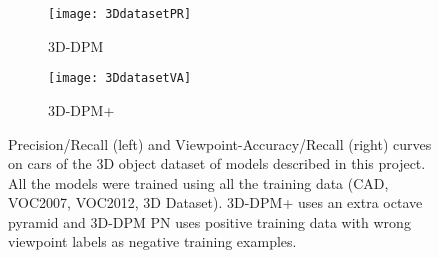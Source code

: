 

\begin{figure}
\begin{center}
	\begin{subfigure}[b]{0.49\textwidth}
       		\texttt{[image: 3DdatasetPR]}       
                \caption{3D-DPM}
        \end{subfigure}
        \begin{subfigure}[b]{0.49\textwidth}
       		\texttt{[image: 3DdatasetVA]}       
       		\caption{3D-DPM+}
        \end{subfigure}
\caption{Precision/Recall (left) and Viewpoint-Accuracy/Recall (right) curves on cars of the 3D object dataset \cite{4408987} of models described in this project. All the models were trained using all the training data (CAD, VOC2007, VOC2012, 3D Dataset). 3D-DPM+ uses an extra octave pyramid and 3D-DPM PN uses positive training data with wrong viewpoint labels as negative training examples.}
\label{fig:PR3DDataset}
\end{center}
\end{figure}

